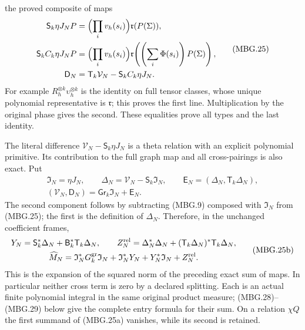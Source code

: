 the proved composite of maps
\[
 \begin{split}
 \mathsf S_k\eta J_NP&=\Bigl(\prod_i v_h(s_i)\Bigr)\mathfrak r(P(\Sigma)),\\
 \mathsf S_k C_k\eta J_NP&=
  \Bigl(\prod_i v_h(s_i)\Bigr)
          \mathfrak r\!\left(\left(\sum_i\Phi(s_i)\right)P(\Sigma)\right),\\
 \mathsf D_N&=\mathsf T_k\mathcal V_N-\mathsf S_k C_k\eta J_N .
 \end{split}
 \tag{MBG.25}\label{eq:mbg-strict-window-map}
\]
For example \(R_h^{\otimes k}\upsilon_h^{\otimes k}\) is the identity
on full tensor classes, whose unique polynomial representative is
\(\mathfrak r\); this proves the first line. Multiplication by the
original phase gives the second. These equalities prove all types
and the last identity.

The literal difference
\(\mathcal V_N-\mathsf S_k\eta J_N\) is a theta relation with an
explicit polynomial primitive. Its contribution to the full graph map
and all cross-pairings is also exact. Put
\[
 \begin{gathered}
 \mathfrak I_N=\eta J_N,\qquad
 \Delta_N=\mathcal V_N-\mathsf S_k\mathfrak I_N,\qquad
 \mathsf E_N=(\Delta_N,\mathsf T_k\Delta_N),\\
 (\mathcal V_N,\mathsf D_N)
      =\mathsf{Gr}_k\mathfrak I_N+\mathsf E_N .
 \end{gathered}
 \tag{MBG.25a}\label{eq:mbg-graph-relation-composite}
\]
The second component follows by subtracting (MBG.9) composed with
\(\mathfrak I_N\) from (MBG.25); the first is the definition of
\(\Delta_N\). Therefore, in the unchanged coefficient frames,
\[
 \begin{gathered}
 Y_N=\mathsf S_k^*\Delta_N+
                   \mathsf B_k^*\mathsf T_k\Delta_N,\qquad
 Z_N^{\rm rel}=\Delta_N^*\Delta_N+
                  (\mathsf T_k\Delta_N)^*\mathsf T_k\Delta_N,\\
 \widehat M_N=\mathfrak I_N^*G_k^{\rm gr}\mathfrak I_N
     +\mathfrak I_N^*Y_N+Y_N^*\mathfrak I_N+Z_N^{\rm rel}.
 \end{gathered}
 \tag{MBG.25b}\label{eq:mbg-graph-relation-cross}
\]
This is the expansion of the squared norm of the preceding exact
sum of maps. In particular neither cross term is zero by a declared
splitting. Each is an actual finite polynomial integral in the same
original product measure; (MBG.28)--(MBG.29) below give the complete
entry formula for their sum. On a relation \(\chi Q\) the first
summand of (MBG.25a) vanishes, while its second is retained.

